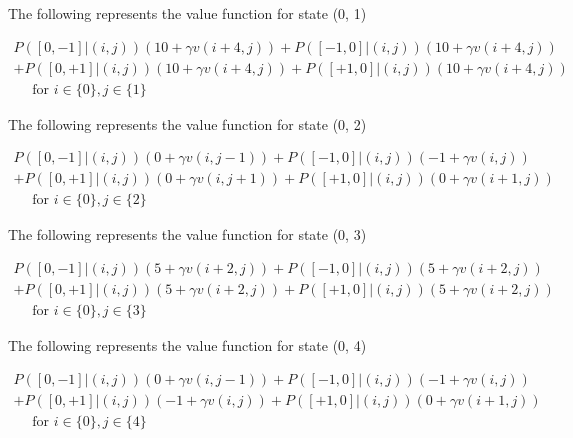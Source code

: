 \documentclass[11pt]{article}
\begin{document}
\noindent
The following represents the value function for state (0, 1)

\begin{equation}
\begin{array}{c}
{P([0,-1] |(i, j))(10+\gamma v(i+4, j))+P([-1,0]|(i,j))(10+\gamma v(i+4, j))} \\
{+P([0,+1] |(i, j))(10+\gamma v(i+4, j))+P([+1,0]|(i,j))(10+\gamma v(i+4, j))} \\
{\quad \text { for } i \in\{0\}, j \in\{1\}}
\end{array}
\end{equation}

\noindent
The following represents the value function for state (0, 2)

\begin{equation}
\begin{array}{c}
{P([0,-1] |(i, j))(0+\gamma v(i, j-1))+P([-1,0] |(i, j))(-1+\gamma v(i, j))} \\
{+P([0,+1] |(i, j))(0+\gamma v(i, j+1))+P([+1,0] |(i, j))(0+\gamma v(i+1, j))} \\
{\quad \text { for } i \in\{0\}, j \in\{2\}}
\end{array}
\end{equation}

\noindent
The following represents the value function for state (0, 3)

\begin{equation}
\begin{array}{c}
{P([0,-1] |(i, j))(5+\gamma v(i+2, j))+P([-1,0] |(i, j))(5+\gamma v(i+2, j))} \\
{+P([0,+1] |(i, j))(5+\gamma v(i+2, j))+P([+1,0] |(i, j))(5+\gamma v(i+2, j))} \\
{\quad \text { for } i \in\{0\}, j \in\{3\}}
\end{array}
\end{equation}

\noindent
The following represents the value function for state (0, 4)

\begin{equation}
\begin{array}{c}
{P([0,-1] |(i, j))(0+\gamma v(i, j-1))+P([-1,0] |(i, j))(-1+\gamma v(i, j))} \\
{+P([0,+1] |(i, j))(-1+\gamma v(i, j))+P([+1,0] |(i, j))(0+\gamma v(i+1, j))} \\
{\quad \text { for } i \in\{0\}, j \in\{4\}}
\end{array}
\end{equation}
\end{document}
